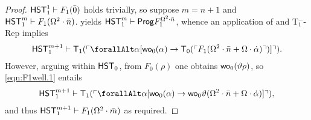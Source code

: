 \documentclass[UKenglish,cleveref,DIV=12]{scrartcl}
\let\forall\forallAlt
\theoremstyle{definition}
\theoremstyle{definition}
\begin{document}
\begin{proof}
$\mathsf{HST}_1^1\vdash F_1(\bar 0)$ holds trivially, so suppose $m=n+1$ and $\mathsf{HST}_1^m\vdash F_1(\Omega^2\cdot\bar n)$.
 yields $\mathsf{HST}_1^m\vdash \mathsf{Prog}  F_1^{\Omega^2\cdot\bar n}$, whence an application of  and T$^-_1$-Rep implies
\begin{align}\label{eqn:F1well.1}
  \HST_1^{m+1}\proves \T_1(\gn{\forall\alpha[\wo_0(\alpha)\rightarrow \T_0(\gn{F_1(\Omega^2\cdot\bar n+\Omega\cdot\dot\alpha)})]}).
\end{align}
However, arguing within $\mathsf{HST}_0$, from $F_0(\rho)$ one obtains $\mathsf{wo}_0(\vartheta\rho)$, so \cref{eqn:F1well.1} entails
\begin{align*}
  \HST_1^{m+1}\proves \T_1(\gn{\forall\alpha[\wo_0(\alpha)\rightarrow \wo_0\vartheta(\Omega^2\cdot\bar n+\Omega\cdot \dot\alpha)]}),
\end{align*}
and thus $\mathsf{HST}_1^{m+1}\vdash F_1(\Omega^2\cdot\bar m)$ as required.
\end{proof}
\end{document}
